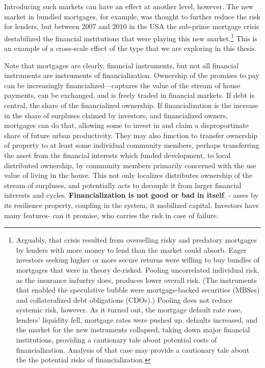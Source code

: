 Introducing such  markets can have an effect at another level, however. The new market in bundled mortgages, for example, was thought to further reduce the risk for lenders, but between 2007 and 2010 in the USA the sub-prime mortgage crisis destabilized the financial institutions that were playing this new market.\footnote{Arguably, that crisis resulted from overselling risky and predatory mortgages by lenders with more money to lend than the market could absorb. Eager investors seeking higher or more secure returns were willing  to buy bundles of  mortgages that were in theory de-risked. Pooling uncorrelated individual risk, as the insurance industry does, produces lower overall risk. (The instruments that enabled the speculative bubble were mortgage-backed securities (MBSes) and collateralized debt obligations (CDOs).) Pooling does not reduce systemic risk, however. As it turned out, the mortgage default rate rose, lenders' liquidity fell, mortgage rates were pushed up, defaults increased, and the market for the new instruments collapsed, taking down major financial institutions, providing a cautionary tale about potential costs of financialization. Analysis of that case may provide a cautionary tale about the the potential risks of financialization.} 
This is an example of a cross-scale effect of the type that we are exploring in this thesis.  

Note that mortgages are clearly, financial instruments, but not all financial instruments are instruments of financialization. Ownership of the promises to pay can be increasingly financialized---captures the value of the stream of house payments, can be exchanged, and is freely traded in financial markets. If debt is central, the share of the financialized ownership.
If financialization is the increase in the share of surpluses claimed by investors, and financialized owners, mortgages can do that, allowing some to invest in and claim a disproportinate share of future urban productivity. They may also function to transfer ownership of property to at least some individual community members, perhaps transferring the asset from the financial interests which funded development, to local distributed ownership, by community members primarily concerned with the use value of living in the house. This not only localizes distributes ownership of the stream of surpluses, and potentially acts to decouple it from larger financial interests and cycles. 
\textbf{Financialization is not good or bad in itself}. - asses by its resilience property, coupling in the system, it mobilized capital. Investors have many features- can it promise, who carries the risk in case of failure. 


